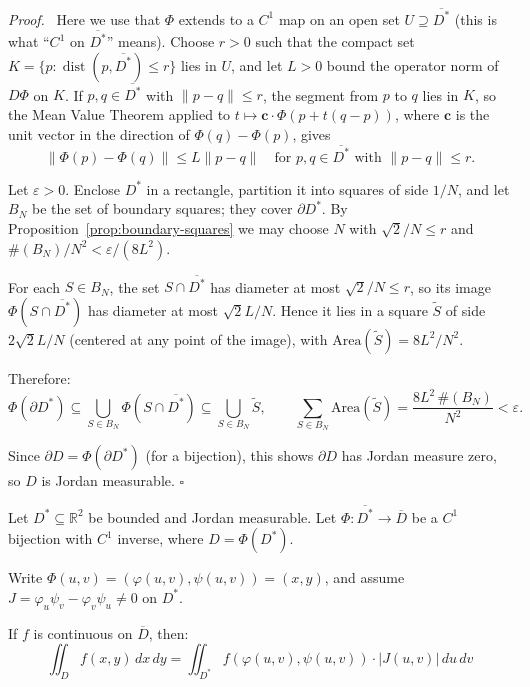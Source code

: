 \documentclass[11pt]{report}
\renewenvironment{proof}[1][Proof]{\par\noindent\textit{#1.}\ }{\hfill$\square$\par\medskip}
\newcommand{\R}{\mathbb{R}}
\begin{document}
\begin{proof}
Here we use that $\Phi$ extends to a $C^1$ map on an open set $U \supseteq \overline{D^*}$ (this is what ``$C^1$ on $\overline{D^*}$'' means). Choose $r > 0$ such that the compact set $K = \{p : \operatorname{dist}(p, \overline{D^*}) \leq r\}$ lies in $U$, and let $L > 0$ bound the operator norm of $D\Phi$ on $K$. If $p, q \in \overline{D^*}$ with $\|p - q\| \leq r$, the segment from $p$ to $q$ lies in $K$, so the Mean Value Theorem applied to $t \mapsto \mathbf{c} \cdot \Phi(p + t(q - p))$, where $\mathbf{c}$ is the unit vector in the direction of $\Phi(q) - \Phi(p)$, gives
\[
\|\Phi(p) - \Phi(q)\| \leq L \|p - q\| \quad \text{for } p, q \in \overline{D^*} \text{ with } \|p - q\| \leq r.
\]

Let $\varepsilon > 0$. Enclose $D^*$ in a rectangle, partition it into squares of side $1/N$, and let $B_N$ be the set of boundary squares; they cover $\partial D^*$. By Proposition~\ref{prop:boundary-squares} we may choose $N$ with $\sqrt{2}/N \leq r$ and $\#(B_N)/N^2 < \varepsilon / (8L^2)$.

For each $S \in B_N$, the set $S \cap \overline{D^*}$ has diameter at most $\sqrt{2}/N \leq r$, so its image $\Phi(S \cap \overline{D^*})$ has diameter at most $\sqrt{2}L/N$. Hence it lies in a square $\tilde{S}$ of side $2\sqrt{2}L/N$ (centered at any point of the image), with $\text{Area}(\tilde{S}) = 8L^2/N^2$.

Therefore:
\[
\Phi(\partial D^*) \subseteq \bigcup_{S \in B_N} \Phi(S \cap \overline{D^*}) \subseteq \bigcup_{S \in B_N} \tilde{S}, \qquad \sum_{S \in B_N} \text{Area}(\tilde{S}) = \frac{8L^2 \, \#(B_N)}{N^2} < \varepsilon.
\]

Since $\partial D = \Phi(\partial D^*)$ (for a bijection), this shows $\partial D$ has Jordan measure zero, so $D$ is Jordan measurable.
\end{proof}

\begin{theorem}
\label{thm:cov-general}
Let $D^* \subseteq \R^2$ be bounded and Jordan measurable. Let $\Phi: \overline{D^*} \to \overline{D}$ be a $C^1$ bijection with $C^1$ inverse, where $D = \Phi(D^*)$.

Write $\Phi(u, v) = (\varphi(u, v), \psi(u, v)) = (x, y)$, and assume $J = \varphi_u \psi_v - \varphi_v \psi_u \neq 0$ on $D^*$.

If $f$ is continuous on $\overline{D}$, then:
\[
\boxed{\iint_D f(x, y) \, dx \, dy = \iint_{D^*} f(\varphi(u, v), \psi(u, v)) \cdot |J(u, v)| \, du \, dv}
\]
\end{theorem}
\end{document}
